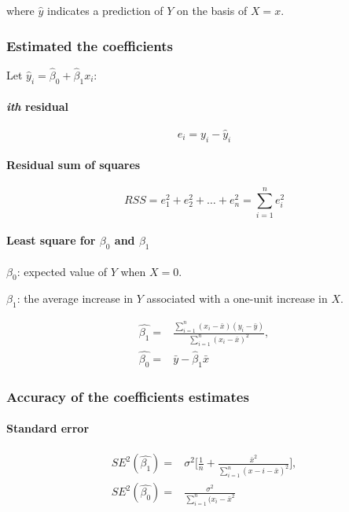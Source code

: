 \documentclass[a4paper]{article}
\begin{document}
			where $\hat{y}$ indicates a prediction of $Y$ on the basis of $X=x$.
		
			\subsubsection{Estimated the coefficients}
				Let $\hat{y}_i = \hat{\beta}_0 + \hat{\beta}_1 x_i$:			
				\paragraph{\textit{ith} residual}
				\begin{equation}
					e_i = y_i - \hat{y}_i 
				\end{equation}
				
				\paragraph{Residual sum of squares}
				\begin{equation}\label{eq:RSS}
					RSS = e_1^2 + e_2^2 + \dots + e_n^2 = \sum_{i=1}^n e_i^2
				\end{equation}		
				
				\paragraph{Least square for $\beta_0$ and $\beta_1$}
				\begin{description}
					\item $\beta_0$: expected value of $Y$ when $X = 0$.
					\item $\beta_1$: the average increase in $Y$ associated with a one-unit increase in $X$.		
				\end{description}
				
				\begin{align}
						\hat{\beta_1} ={}& \frac{\sum_{i=1}^n (x_i - \bar{x})(y_i - \bar{y})}{\sum_{i=1}^n(x_i - \bar{x})^2},
				\\
						\hat{\beta_0} ={}& \bar{y} - \hat{\beta}_1 \bar{x}
				\end{align}
				
			\subsubsection{Accuracy of the coefficients estimates}
				
				\paragraph{Standard error}
				\begin{align}
					SE^2(\hat{\beta_1}) ={}& \sigma^2 \Bigg[ \frac{1}{n} + \frac{\bar{x}^2}{\sum_{i=1}^{n}(x-i - \bar{x})^2} \Bigg], 
					\\
					SE^2(\hat{\beta_0}) ={}& \frac{\sigma^2}{\sum_{i=1}^n(x_i - \bar{x}^2}
				\end{align}		
				
\end{document}
